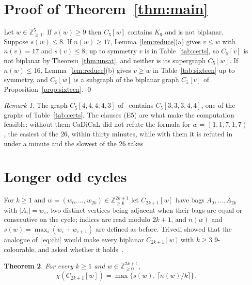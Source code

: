 \documentclass[11pt]{amsart}
\newtheorem{theorem}{Theorem}[section]
\theoremstyle{definition}
\theoremstyle{remark}
\newtheorem{remark}[theorem]{Remark}
\numberwithin{equation}{section}
\newcommand{\Z}{\mathbb{Z}}
\newcommand{\cw}{C_5[w]}
\begin{document}
\section{Proof of Theorem~\ref{thm:main}}\label{sec:proof}

Let $w\in\Z_{\ge1}^5$. If $s(w)\ge9$ then $\cw$ contains $K_9$ and is not biplanar. Suppose $s(w)\le8$. If $n(w)\ge17$, Lemma~\ref{lem:reduce}(a) gives $v\le w$ with $n(v)=17$ and $s(v)\le8$; up to symmetry $v$ is in Table~\ref{tab:certs}, so $C_5[v]$ is not biplanar by Theorem~\ref{thm:unsat}, and neither is its supergraph $\cw$. If $n(w)\le16$, Lemma~\ref{lem:reduce}(b) gives $v\ge w$ in Table~\ref{tab:sixteen} up to symmetry, and $\cw$ is a subgraph of the biplanar graph $C_5[v]$ of Proposition~\ref{prop:sixteen}. \qed

\begin{remark}
The graph $C_5[4,4,4,4,3]$ of~\cite{KSS} contains $C_5[3,3,3,4,4]$, one of the graphs of Table~\ref{tab:certs}. The clauses (E5) are what make the computation feasible: without them CaDiCaL did not refute the formula for $w=(1,1,7,1,7)$, the easiest of the $26$, within thirty minutes, while with them it is refuted in under a minute and the slowest of the $26$ takes %
\end{remark}

\section{Longer odd cycles}\label{sec:odd}

For $k\ge1$ and $w=(w_0,\dots,w_{2k})\in\Z_{\ge0}^{2k+1}$ let $C_{2k+1}[w]$ have bags $A_0,\dots,A_{2k}$ with $|A_i|=w_i$, two distinct vertices being adjacent when their bags are equal or consecutive on the cycle; indices are read modulo $2k+1$, and $n(w)$ and $s(w)=\max_i(w_i+w_{i+1})$ are defined as before. Trivedi showed that the analogue of~\eqref{eq:chi} would make every biplanar $C_{2k+1}[w]$ with $k\ge3$ $9$-colourable, and asked whether it holds~\cite[Question~7.1]{Tr}.

\begin{theorem}\label{thm:odd}
For every $k\ge1$ and $w\in\Z_{\ge0}^{2k+1}$,
\begin{equation}\label{eq:odd}
\chi(C_{2k+1}[w])=\max\bigl\{s(w),\,\lceil n(w)/k\rceil\bigr\}.
\end{equation}
\end{theorem}
\end{document}
